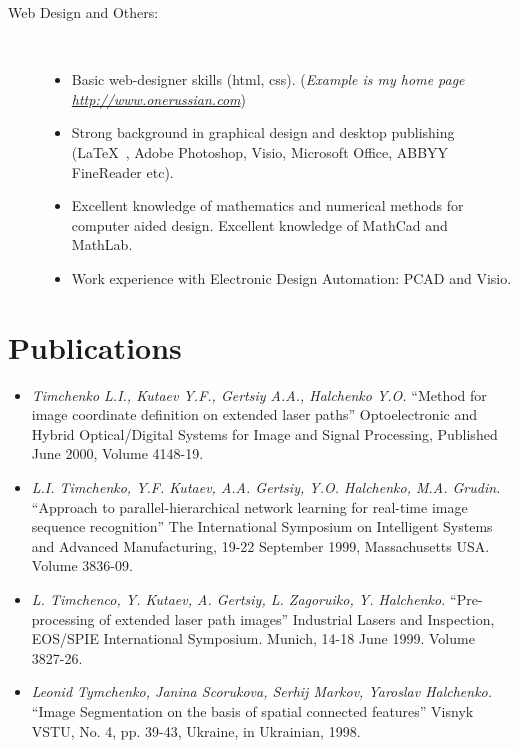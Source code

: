 \documentclass[10pt,overlapped,line]{res}
\newcommand{\wdescription}[1]{({\small \textit{#1}})}
\newcommand{\mtitle}[1]{``#1''}
\newcommand{\mauthors}[1]{ \textit{#1.}}
\newcommand{\mwhere}[1]{#1.}
\begin{document}
\begin{resume}
\begin{description}
    \item[Web Design and Others:]  \hspace*{\fill} \\
      \begin{itemize}
      \item Basic web-designer skills (html, css).
        \wdescription{Example is my home page \href{URL}{http://www.onerussian.com}}
      \item Strong background in graphical design and desktop
        publishing (\LaTeX\ , Adobe Photoshop, Visio, Microsoft Office, ABBYY
        FineReader etc).
      \item Excellent knowledge of mathematics and numerical methods
        for computer aided design. Excellent knowledge of MathCad and
        MathLab.
      \item Work experience with Electronic Design Automation: PCAD and
        Visio.
      \end{itemize}
  \end{description}

 \section{Publications}

 \begin{itemize}

  \item
     \mauthors{Timchenko L.I., Kutaev Y.F., Gertsiy A.A., Halchenko Y.O}
     \mtitle{Method for image coordinate definition on extended laser paths}
     \mwhere{Optoelectronic and Hybrid Optical/Digital Systems for Image and Signal Processing, Published June 2000,  Volume 4148-19}

  \item
     \mauthors{L.I. Timchenko, Y.F. Kutaev, A.A. Gertsiy, Y.O. Halchenko,
     M.A. Grudin}
     \mtitle{Approach to parallel-hierarchical network learning for real-time image sequence recognition}
     \mwhere{The International Symposium on Intelligent Systems and Advanced Manufacturing, 19-22 September 1999, Massachusetts USA. Volume 3836-09}

   \item
     \mauthors{L. Timchenco, Y. Kutaev, A. Gertsiy, L. Zagoruiko, Y. Halchenko}
     \mtitle{Pre-processing of extended laser path images}
     \mwhere{Industrial Lasers and Inspection, EOS/SPIE International Symposium. Munich, 14-18 June 1999. Volume 3827-26}

   \item
     \mauthors{Leonid Tymchenko, Janina Scorukova, Serhij Markov, Yaroslav Halchenko}
     \mtitle{Image Segmentation on the basis of spatial connected features}
     \mwhere{Visnyk VSTU, No. 4, pp. 39-43, Ukraine, in Ukrainian, 1998}


\end{itemize}
\end{resume}
\end{document}
